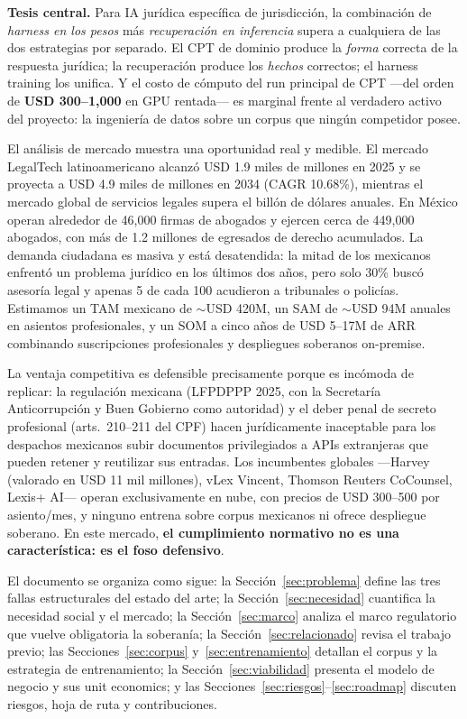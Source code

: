 \begin{tesis}
\textbf{Tesis central.} Para IA jurídica específica de jurisdicción, la combinación de \emph{harness en los pesos} más \emph{recuperación en inferencia} supera a cualquiera de las dos estrategias por separado. El CPT de dominio produce la \emph{forma} correcta de la respuesta jurídica; la recuperación produce los \emph{hechos} correctos; el harness training los unifica. Y el costo de cómputo del run principal de CPT ---del orden de \textbf{USD 300--1,000} en GPU rentada--- es marginal frente al verdadero activo del proyecto: la ingeniería de datos sobre un corpus que ningún competidor posee.
\end{tesis}

El análisis de mercado muestra una oportunidad real y medible. El mercado LegalTech latinoamericano alcanzó USD 1.9 miles de millones en 2025 y se proyecta a USD 4.9 miles de millones en 2034 (CAGR 10.68\%),\cite{imarc2025} mientras el mercado global de servicios legales supera el billón de dólares anuales.\cite{mordorlegalservices2026} En México operan alrededor de 46,000 firmas de abogados\cite{industryresearch2026} y ejercen cerca de 449,000 abogados,\cite{mirada360} con más de 1.2 millones de egresados de derecho acumulados.\cite{forojuridico2023} La demanda ciudadana es masiva y está desatendida: la mitad de los mexicanos enfrentó un problema jurídico en los últimos dos años, pero solo 30\% buscó asesoría legal y apenas 5 de cada 100 acudieron a tribunales o policías.\cite{wjpmx2019,justiciaabierta2025} Estimamos un TAM mexicano de $\sim$USD 420M, un SAM de $\sim$USD 94M anuales en asientos profesionales, y un SOM a cinco años de USD 5--17M de ARR combinando suscripciones profesionales y despliegues soberanos on-premise.

La ventaja competitiva es defensible precisamente porque es incómoda de replicar: la regulación mexicana (LFPDPPP 2025, con la Secretaría Anticorrupción y Buen Gobierno como autoridad\cite{lfpdppp,ccn2025}) y el deber penal de secreto profesional (arts.~210--211 del CPF\cite{cpf}) hacen jurídicamente inaceptable para los despachos mexicanos subir documentos privilegiados a APIs extranjeras que pueden retener y reutilizar sus entradas. Los incumbentes globales ---Harvey (valorado en USD 11 mil millones\cite{harvey2026}), vLex Vincent, Thomson Reuters CoCounsel, Lexis+ AI--- operan exclusivamente en nube, con precios de USD 300--500 por asiento/mes,\cite{vaquill2026} y ninguno entrena sobre corpus mexicanos ni ofrece despliegue soberano. En este mercado, \textbf{el cumplimiento normativo no es una característica: es el foso defensivo}.

El documento se organiza como sigue: la Sección~\ref{sec:problema} define las tres fallas estructurales del estado del arte; la Sección~\ref{sec:necesidad} cuantifica la necesidad social y el mercado; la Sección~\ref{sec:marco} analiza el marco regulatorio que vuelve obligatoria la soberanía; la Sección~\ref{sec:relacionado} revisa el trabajo previo; las Secciones~\ref{sec:corpus} y~\ref{sec:entrenamiento} detallan el corpus y la estrategia de entrenamiento; la Sección~\ref{sec:viabilidad} presenta el modelo de negocio y sus unit economics; y las Secciones~\ref{sec:riesgos}--\ref{sec:roadmap} discuten riesgos, hoja de ruta y contribuciones.
